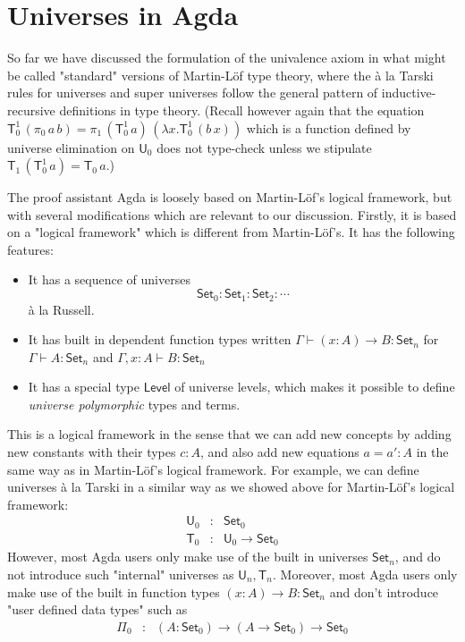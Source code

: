 \documentclass[11pt,a4paper]{article}
\def\UU{\mathsf{U}}
\def\Level{\mathsf{Level}}
\newcommand{\Set}{\mathsf{Set}}
\newcommand{\T}{\mathsf{T}}
\begin{document}
\section{Universes in Agda}\label{sec:Agda}

So far we have discussed the formulation of the univalence axiom in what might be called "standard" versions of Martin-Löf type theory, where the \`a la Tarski rules for universes and super universes follow the general pattern of inductive-recursive definitions in type theory. (Recall however again that the equation
$
\T_0^1\, (\pi_0\,a\, b) = \pi_1\,(\T_0^1\,a)\,(\lambda x.\T_0^1\,(b\,x))
$
which is a function defined by universe elimination on $\UU_0$ does not type-check unless we stipulate $\T_1\, (\T_0^1\, a) = \T_0\, a$.)


The proof assistant Agda is loosely based on Martin-Löf's logical framework, but with several modifications which are relevant to our discussion. Firstly, it is based on a "logical framework" which is different from Martin-Löf's. It has the following features:
\begin{itemize}
\item It has a sequence of universes  $$\Set_0 : \Set_1 : \Set_2 : \cdots$$  \`a la Russell.
\item It has built in dependent function types written $\Gamma \vdash (x : A)\to B : \Set_n$ for $\Gamma \vdash A : \Set_n$ and $\Gamma , x : A \vdash B : \Set_n$
\item It has a special type $\Level$ of universe levels, which makes it possible to define {\em universe polymorphic} types and terms.
\end{itemize}
This is a logical framework in the sense that we can add new concepts by adding new constants with their types $c : A$, and also add new equations $a = a' : A$ in the same way as in Martin-Löf's logical framework. For example, we can define universes \`a la Tarski in a similar way as we showed above for Martin-Löf's logical framework:
\begin{eqnarray*}
\UU_0 &: &\Set_0\\
\T_0 &:& \UU_0 \to \Set_0
\end{eqnarray*}
However, most Agda users only make use of the built in universes $\Set_n$, and do not introduce such "internal" universes as $\UU_n, \T_n$. Moreover, most Agda users only make use of the built in function types $(x : A)\to B : \Set_n$ and don't introduce "user defined data types" such as
\begin{eqnarray*}
\Pi_0 &:& (A:\Set_0) \to (A \to \Set_0) \to \Set_0
\end{eqnarray*}
\end{document}
